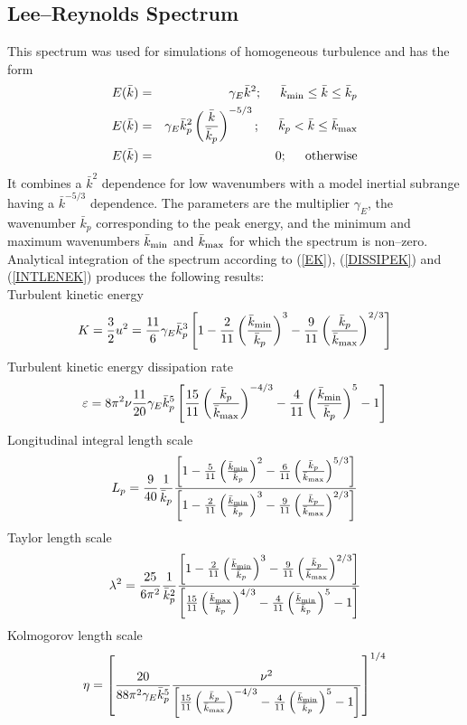 \documentclass[dvips]{article}
\begin{document}
\subsection{Lee--Reynolds Spectrum}
This spectrum was used for simulations of homogeneous
turbulence \cite{leereynolds} and has the form
\begin{eqnarray}
E(\bar{k}) & = & \gamma_{E} \bar{k}^{2}; \hspace{5mm}
\bar{k}_{\rm min}\leq\bar{k}\leq \bar{k}_{p} \nonumber \\
E(\bar{k}) & = & \gamma_{E}\bar{k}_{p}^{2}
\left(\frac{\bar{k}}{\bar{k}_{p}}\right)^{-5/3};
\hspace{5mm}\bar{k}_{p}<\bar{k}\le\bar{k}_{\rm max} \nonumber \\
E(\bar{k}) & = & 0; \hspace{5mm}{\rm otherwise}
\end{eqnarray}
It combines a $\bar{k}^{2}$ dependence for
low wavenumbers with a model inertial subrange having a $\bar{k}^{-5/3}$
dependence.  The parameters are the multiplier $\gamma_{E}$, the wavenumber
$\bar{k}_{p}$ corresponding to the peak energy, and the minimum and maximum
wavenumbers $\bar{k}_{\rm min}$ and $\bar{k}_{\rm
max}$ for which the spectrum is non--zero.  Analytical integration of the
spectrum according to (\ref{EK}), (\ref{DISSIPEK}) and (\ref{INTLENEK})
produces the following results:\\[1mm]
Turbulent kinetic energy
\[
K = \frac{3}{2}u^{2} =
\frac{11}{6}\gamma_{E}\bar{k}_{p}^{3}\left[1 -
\frac{2}{11}\left(\frac{\bar{k}_{\rm min}}{\bar{k}_{p}}\right)^{3} -
\frac{9}{11}\left(\frac{\bar{k}_{p}}{\bar{k}_{\rm max}}\right)^{2/3}\right]
\]
Turbulent kinetic energy dissipation rate
\[
\varepsilon = 
8\pi^{2}\nu\frac{11}{20}\gamma_{E}\bar{k}_{p}^{5}\left[
\frac{15}{11}\left(\frac{\bar{k}_{p}}{\bar{k}_{\rm max}}\right)^{-4/3} -
\frac{4}{11}\left(\frac{\bar{k}_{\rm min}}{\bar{k}_{p}}\right)^{5} - 1
\right]
\]
Longitudinal integral length scale
\[
L_{p} = 
\frac{9}{40}\frac{1}{\bar{k}_{p}}
\frac{\left[1 -
\frac{5}{11}\left(\frac{\bar{k}_{\rm min}}{\bar{k}_{p}}\right)^{2} -
\frac{6}{11}\left(\frac{\bar{k}_{p}}{\bar{k}_{\rm
max}}\right)^{5/3}\right]}
{\left[1 -
\frac{2}{11}\left(\frac{\bar{k}_{\rm min}}{\bar{k}_{p}}\right)^{3} -
\frac{9}{11}\left(\frac{\bar{k}_{p}}{\bar{k}_{\rm max}}\right)^{2/3}\right]}
\]
Taylor length scale
\[
\lambda^{2} = 
\frac{25}{6\pi^{2}}\frac{1}{\bar{k}_{p}^{2}}
\frac{\left[1 -
\frac{2}{11}\left(\frac{\bar{k}_{\rm min}}{\bar{k}_{p}}\right)^{3} -
\frac{9}{11}\left(\frac{\bar{k}_{p}}{\bar{k}_{\rm
max}}\right)^{2/3}\right]}
{\left[
\frac{15}{11}\left(\frac{\bar{k}_{\rm max}}{\bar{k}_{p}}\right)^{4/3} -
\frac{4}{11}\left(\frac{\bar{k}_{\rm min}}{\bar{k}_{p}}\right)^{5} - 1
\right]}
\]
Kolmogorov length scale
\[
\eta = 
\left[
\frac{20}{88\pi^{2}\gamma_{E}\bar{k}_{p}^{5}}
\frac{\nu^{2}}{\left[
\frac{15}{11}\left(\frac{\bar{k}_{p}}{\bar{k}_{\rm max}}\right)^{-4/3} -
\frac{4}{11}\left(\frac{\bar{k}_{\rm min}}{\bar{k}_{p}}\right)^{5} - 1
\right]}
\right]^{1/4}
\]
\end{document}
